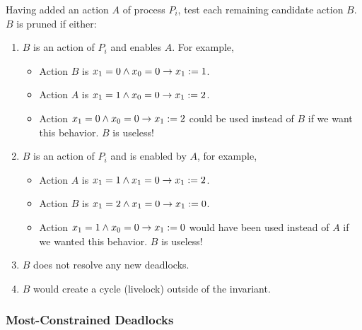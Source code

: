 Having added an action $A$ of process $P_i$, test each remaining candidate action $B$.
$B$ is pruned if either:
\begin{enumerate}
\item $B$ is an action of $P_i$ and enables $A$. For example,
 \begin{itemize}
 \item[] Action $B$ is $x_1 = 0 \wedge x_0 = 0 \to x_1:= 1$.
 \item[] Action $A$ is $x_1 = 1 \wedge x_0 = 0 \to x_1:= 2$.
 \item Action $x_1 = 0 \wedge x_0 = 0 \to x_1:= 2$ could be used instead of $B$ if we want this behavior. $B$ is useless!
 \end{itemize}
\item $B$ is an action of $P_i$ and is enabled by $A$, for example,
 \begin{itemize}
 \item[] Action $A$ is $x_1 = 1 \wedge x_1 = 0 \to x_1:= 2$.
 \item[] Action $B$ is $x_1 = 2 \wedge x_1 = 0 \to x_1:= 0$.
 \item Action $x_1 = 1 \wedge x_0 = 0 \to x_1:= 0$ would have been used instead of $A$ if we wanted this behavior. $B$ is useless!
 \end{itemize}
\item $B$ does not resolve any new deadlocks.
\item $B$ would create a cycle (livelock) outside of the invariant.
\end{enumerate}

\subsubsection{Most-Constrained Deadlocks}

